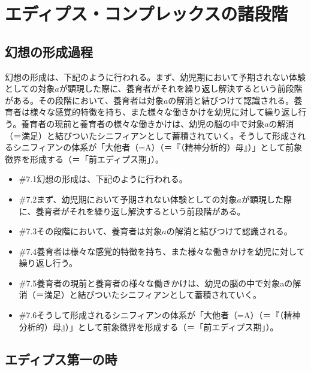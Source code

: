 \section{エディプス・コンプレックスの諸段階}\label{ux30a8ux30c7ux30a3ux30d7ux30b9ux30b3ux30f3ux30d7ux30ecux30c3ux30afux30b9ux306eux8af8ux6bb5ux968e}

\subsection{幻想の形成過程}\label{ux5e7bux60f3ux306eux5f62ux6210ux904eux7a0b}

幻想の形成は、下記のように行われる。まず、幼児期において予期されない体験としての対象\(a\)が顕現した際に、養育者がそれを繰り返し解決するという前段階がある。その段階において、養育者は対象\(a\)の解消と結びつけて認識される。養育者は様々な感覚的特徴を持ち、また様々な働きかけを幼児に対して繰り返し行う。養育者の現前と養育者の様々な働きかけは、幼児の脳の中で対象\(a\)の解消（＝満足）と結びついたシニフィアンとして蓄積されていく。そうして形成されるシニフィアンの体系が「大他者（=A）（＝『（精神分析的）母』）」として前象徴界を形成する（＝「前エディプス期」）。

\begin{note}{}
  \begin{itemize}
    \tightlist
    \item{\#7.1}幻想の形成は、下記のように行われる。
    \item{\#7.2}まず、幼児期において予期されない体験としての対象$a$が顕現した際に、養育者がそれを繰り返し解決するという前段階がある。
    \item{\#7.3}その段階において、養育者は対象$a$の解消と結びつけて認識される。
    \item{\#7.4}養育者は様々な感覚的特徴を持ち、また様々な働きかけを幼児に対して繰り返し行う。
    \item{\#7.5}養育者の現前と養育者の様々な働きかけは、幼児の脳の中で対象aの解消（＝満足）と結びついたシニフィアンとして蓄積されていく。
    \item{\#7.6}そうして形成されるシニフィアンの体系が「大他者（=A）（＝『（精神分析的）母』）」として前象徴界を形成する（＝「前エディプス期」）。
  \end{itemize}
\end{note}

\subsection{エディプス第一の時}\label{ux30a8ux30c7ux30a3ux30d7ux30b9ux7b2cux4e00ux306eux6642}

